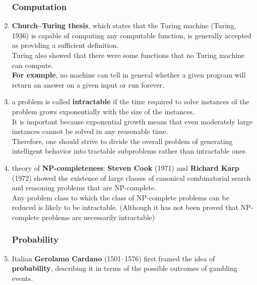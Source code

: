 \begin{enumerate}
    \subsubsection*{Computation}

    \item \textbf{Church–Turing thesis}, which states that the Turing machine (Turing, 1936) is capable of computing any computable function, is generally accepted as providing a sufficient definition.\\
    Turing also showed that there were some functions that no Turing machine can compute.\\
    \textbf{For example}, no machine can tell in general whether a given program will return an answer on a given input or run forever. 

    \item a problem is called \textbf{intractable} if the time required to solve instances of the problem grows exponentially with the size of the instances.\\
    It is important because exponential growth means that even moderately large instances cannot be solved in any reasonable time.\\
    Therefore, one should strive to divide the overall problem of generating intelligent behavior into tractable subproblems rather than intractable ones. 

    \item theory of \textbf{NP-completeness}: \textbf{Steven Cook} (1971) and \textbf{Richard Karp} (1972) showed the existence of large classes of canonical combinatorial search and reasoning problems that are NP-complete.\\
    Any problem class to which the class of NP-complete problems can be reduced is likely to be intractable. (Although it has not been proved that NP-complete problems are necessarily intractable)

    \subsubsection*{Probability}

    \item Italian \textbf{Gerolamo Cardano} (1501–1576) first framed the idea of \textbf{probability}, describing it in terms of the possible outcomes of gambling events.
\end{enumerate}

